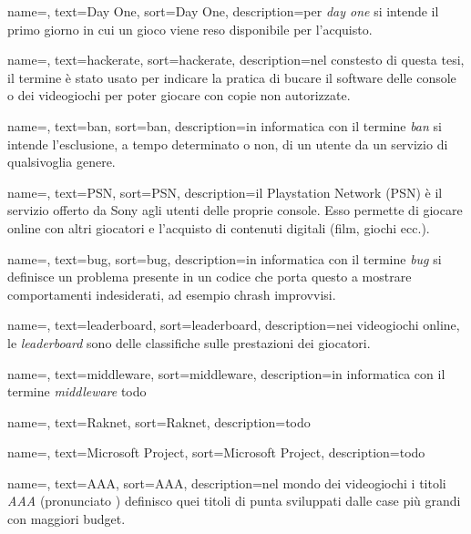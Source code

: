 {
	name=,
	text=Day One,
	sort=Day One,
	description={per \emph{day one} si intende il primo giorno in cui un gioco viene reso disponibile per l'acquisto.}
}

{
	name=,
	text=hackerate,
	sort=hackerate,
	description={nel constesto di questa tesi, il termine è stato usato per indicare la pratica di bucare il software delle console o dei videogiochi per poter giocare con copie non autorizzate.}
}

{
	name=,
	text=ban,
	sort=ban,
	description={in informatica con il termine \emph{ban} si intende l'esclusione, a tempo determinato o non, di un utente da un servizio di qualsivoglia genere.}
}

{
	name=,
	text=PSN,
	sort=PSN,
	description={il Playstation Network (PSN) è il servizio offerto da Sony agli utenti delle proprie console. Esso permette di giocare online con altri giocatori e l'acquisto di contenuti digitali (film, giochi ecc.). }
}

{
	name=,
	text=bug,
	sort=bug,
	description={in informatica con il termine \emph{bug} si definisce un problema presente in un codice che porta questo a mostrare comportamenti indesiderati, ad esempio chrash improvvisi.}
}

{
	name=,
	text=leaderboard,
	sort=leaderboard,
	description={nei videogiochi online, le \emph{leaderboard} sono delle classifiche sulle prestazioni dei giocatori. }
}

{
	name=,
	text=middleware,
	sort=middleware,
	description={in informatica con il termine \emph{middleware} todo}
}

{
	name=,
	text=Raknet,
	sort=Raknet,
	description={todo}
}

{
	name=,
	text=Microsoft Project,
	sort=Microsoft Project,
	description={todo}
}

{
	name=,
	text=AAA,
	sort=AAA,
	description={nel mondo dei videogiochi i titoli \emph{AAA} (pronunciato ) definisco quei titoli di punta sviluppati dalle case più grandi con maggiori budget.}
}

